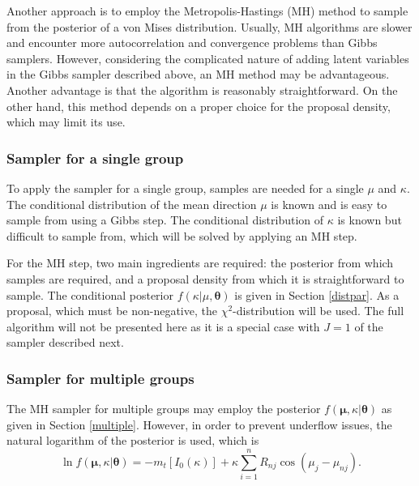\documentclass[]{gSCS2e}
\theoremstyle{plain}
\theoremstyle{definition}
\theoremstyle{remark}
\begin{document}
Another approach is to employ the Metropolis-Hastings (MH) method \cite{metropolis1953equation, hastings1970monte} to sample from the posterior of a von Mises distribution. Usually, MH algorithms are slower and encounter more autocorrelation and convergence problems than Gibbs samplers. However, considering the complicated nature of adding latent variables in the Gibbs sampler described above, an MH method may be advantageous. Another advantage is that the algorithm is reasonably straightforward. On the other hand, this method depends on a proper choice for the proposal density, which may limit its use.


\subsubsection{Sampler for a single group}

To apply the sampler for a single group, samples are needed for a single $\mu$ and $\kappa$. The conditional distribution of the mean direction $\mu$ is known and is easy to sample from using a Gibbs step. The conditional distribution of $\kappa$ is known but difficult to sample from, which will be solved by applying an MH step. 

For the MH step, two main ingredients are required: the posterior from which samples are required, and a proposal density from which it is straightforward to sample. The conditional posterior $f(\kappa \vert \mu, \boldsymbol\theta)$ is given in Section \ref{distpar}. As a proposal, which must be non-negative, the $\chi^2$-distribution will be used. The full algorithm will not be presented here as it is a special case with $J=1$ of the sampler described next. 

\subsubsection{Sampler for multiple groups \label{MHmulti}}

The MH sampler for multiple groups may employ the posterior $f(\boldsymbol\mu, \kappa \vert \boldsymbol\theta)$ as given in Section \ref{multiple}. However, in order to prevent underflow issues, the natural logarithm of the posterior is used, which is $$ \ln f(\boldsymbol{\mu}, \kappa \vert \boldsymbol\theta) = - m_t  \left[  I_0(\kappa)\right] +  \kappa \sum_{i=1}^{n} R_{nj} \cos(\mu_{j} - \mu_{nj}). $$ 
\end{document}
